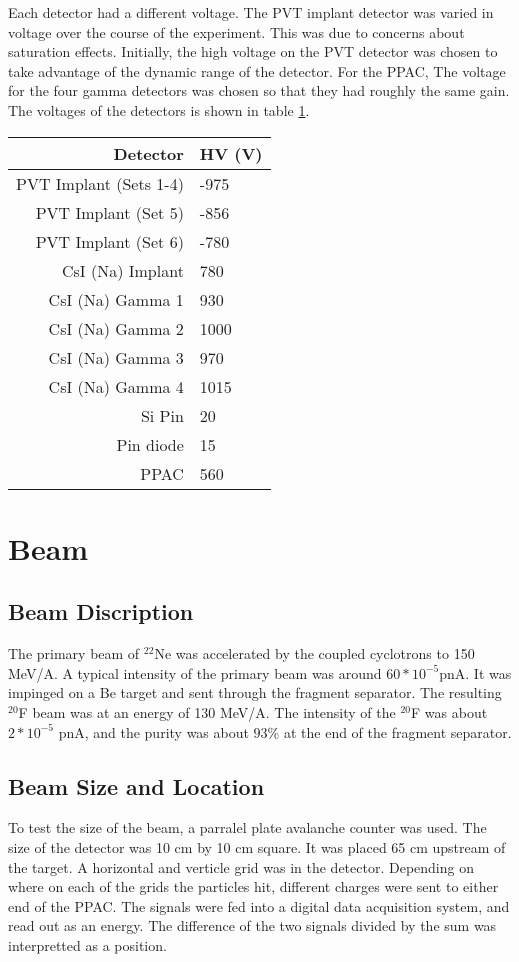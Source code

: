 Each detector had a different voltage. 
The PVT implant detector was varied in voltage over the course of the experiment.
This was due to concerns about saturation effects.
Initially, the high voltage on the PVT detector was chosen to take advantage of the dynamic range of the detector.
For the PPAC, 
The voltage for the four gamma detectors was chosen so that they had roughly the same gain.
The voltages of the detectors is shown in table \ref{tab:detvolt}.
\begin{table}[!hbt]
	\centering
		\begin{tabular}{r|l}
		Detector & HV (V) \\ \hline
		PVT Implant (Sets 1-4) & -975 \\
		PVT Implant (Set 5) & -856 \\
		PVT Implant (Set 6) & -780 \\
		CsI (Na) Implant & 780 \\ 
		CsI (Na) Gamma 1 & 930 \\
		CsI (Na) Gamma 2 & 1000 \\
		CsI (Na) Gamma 3 & 970 \\
		CsI (Na) Gamma 4 & 1015 \\
		Si Pin & 20 \\
		Pin diode & 15 \\
		PPAC & 560 
		\label{tab:detvolt}
		\end{tabular}
\end{table}

\section{Beam}

\subsection{Beam Discription}
The primary beam of $^{22}$Ne was accelerated by the coupled cyclotrons to 150 MeV/A. 
A typical intensity of the primary beam was around $60 * 10^{-5}$pnA.
It was impinged on a Be target and sent through the fragment separator. 
The resulting $^{20}$F beam was at an energy of 130 MeV/A. 
The intensity of the $^{20}$F was about $2 * 10^{-5}$ pnA, and the purity was about $93\%$ at the end of the fragment separator.

\subsection{Beam Size and Location}
To test the size of the beam, a parralel plate avalanche counter was used.
The size of the detector was 10 cm by 10 cm square. 
It was placed 65 cm upstream of the target.
A horizontal and verticle grid was in the detector.
Depending on where on each of the grids the particles hit, different charges were sent to either end of the PPAC.
The signals were fed into a digital data acquisition system, and read out as an energy.
The difference of the two signals divided by the sum was interpretted as a position.

